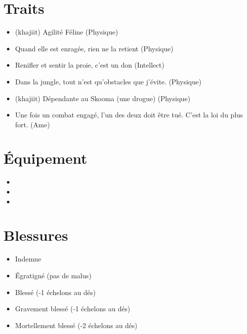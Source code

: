 \documentclass{Tamriel}
\begin{document}
\begin{multicols*}{2}
\raggedcolumns
        
        \section*{Traits}

        \begin{itemize}
        \item (khajiit) Agilité Féline (Physique)
        \item Quand elle est enragée, rien ne la retient (Physique)
        \item Renifler et sentir la proie, c'est un don (Intellect)
        \item Dans la jungle, tout n'est qu'obstacles que j'évite. (Physique)
        \item (khajiit) Dépendante au Skooma (une drogue) (Physique)
        \item Une fois un combat engagé, l'un des deux doit être tué. C'est la loi du plus fort. (Ame)
        \end{itemize}
        
        \section*{Équipement}

        \begin{itemize}
        \item 
        \item 
        \item 
        \end{itemize}
        
        \section*{Blessures}

	\begin{itemize}
	\item Indemne
	\item Égratigné (pas de malus)
	\item Blessé (-1 échelons au dés)
	\item Gravement blessé (-1 échelons au dés)
	\item Mortellement blessé (-2 échelons au dés)
        \end{itemize}
        
        \columnbreak
        

\end{multicols*}
\end{document}
